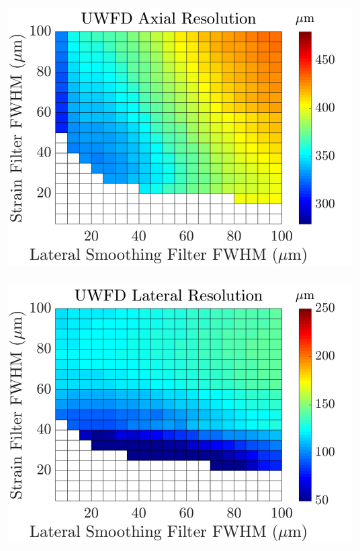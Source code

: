 \begin{figure}[h!]\ContinuedFloat
	\begin{subfigure}{0.49\textwidth}
		\centering
		\includegraphics[width=\textwidth]{imageres_figs/uwfd_axial.png}
	\end{subfigure}
	\begin{subfigure}{0.49\textwidth}
		\centering
		\includegraphics[width=\textwidth]{imageres_figs/uwfd_lateral.png}
	\end{subfigure}
	\\
	\begin{subfigure}{0.49\textwidth}
		\centering

\end{subfigure}
\end{figure}
